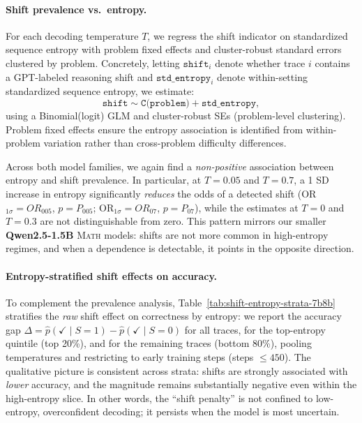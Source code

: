 \paragraph{Shift prevalence vs.\ entropy.}
For each decoding temperature $T$, we regress the shift indicator on standardized sequence entropy with problem fixed effects and cluster-robust standard errors clustered by problem. Concretely, letting $\texttt{shift}_{i}$ denote whether trace $i$ contains a GPT-labeled reasoning shift and $\texttt{std\_entropy}_{i}$ denote within-setting standardized sequence entropy, we estimate:
\[
\texttt{shift} \sim \texttt{C(problem)} + \texttt{std\_entropy},
\]
using a Binomial(logit) GLM and cluster-robust SEs (problem-level clustering). Problem fixed effects ensure the entropy association is identified from within-problem variation rather than cross-problem difficulty differences.

Across both model families, we again find a \emph{non-positive} association between entropy and shift prevalence. In particular, at $T{=}0.05$ and $T{=}0.7$, a 1 SD increase in entropy significantly \emph{reduces} the odds of a detected shift (OR$_{1\sigma}{=}{{OR_005}}$, $p={{P_005}}$; OR$_{1\sigma}{=}{{OR_07}}$, $p={{P_07}}$), while the estimates at $T{=}0$ and $T{=}0.3$ are not distinguishable from zero. This pattern mirrors our smaller \textbf{Qwen2.5-1.5B} \textsc{Math} models: shifts are not more common in high-entropy regimes, and when a dependence is detectable, it points in the opposite direction.

\paragraph{Entropy-stratified shift effects on accuracy.}
To complement the prevalence analysis, Table~\ref{tab:shift-entropy-strata-7b8b} stratifies the \emph{raw} shift effect on correctness by entropy: we report the accuracy gap
$\Delta = \hat p(\checkmark\mid S{=}1) - \hat p(\checkmark\mid S{=}0)$
for all traces, for the top-entropy quintile (top 20\%), and for the remaining traces (bottom 80\%), pooling temperatures and restricting to early training steps (steps $\le\!450$). The qualitative picture is consistent across strata: shifts are strongly associated with \emph{lower} accuracy, and the magnitude remains substantially negative even within the high-entropy slice. In other words, the ``shift penalty'' is not confined to low-entropy, overconfident decoding; it persists when the model is most uncertain.

